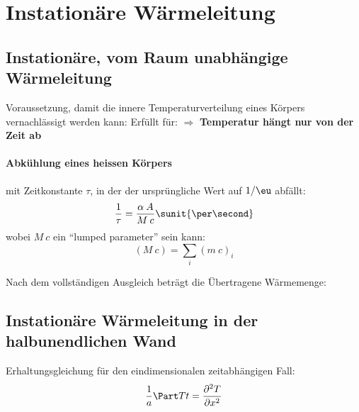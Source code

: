 
\section{Instationäre Wärmeleitung} %
	\subsection{Instationäre, vom Raum un\-ab\-hängige Wärme\-leitung} %
		Voraussetzung, damit die innere Temperaturverteilung eines Körpers vernachlässigt werden kann:
		Erfüllt für:
		$\Rightarrow$ \textbf{Temperatur hängt nur von der Zeit ab}

		\paragraph{Abkühlung eines heissen Körpers} %
			mit Zeitkonstante $\tau$, in der der ursprüngliche Wert auf $1/\eu$ abfällt:
			\[
				\frac{1}{\tau} = \frac{\alpha \: A}{M\: c} \sunit{\per\second}
			\]
			wobei $M\:c$ ein ``lumped parameter'' sein kann:
			\[
				(M\:c) = \sum_i (m\:c)_i
			\]

			Nach dem vollständigen Ausgleich beträgt die Übertragene Wärmemenge:

	\subsection{Instationäre Wärmeleitung in der halbunendlichen Wand} %
		Erhaltungsgleichung für den eindimensionalen zeit\-ab\-hängigen Fall:
		\[
			\frac{1}{a} \Part T t = \frac{\partial^2 T}{\partial x^2}
		\]

